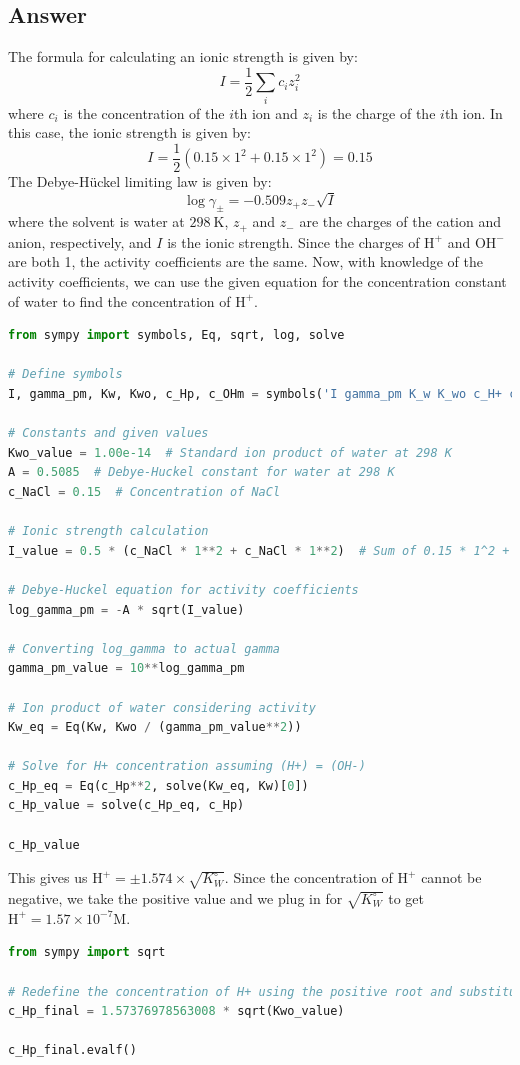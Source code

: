 \documentclass[12pt]{article}
\begin{document}
\subsection{Answer}
The formula for calculating an ionic strength is given by:
\begin{equation}
  I=\frac{1}{2} \sum_{i} c_{i} z_{i}^{2}
\end{equation}
where $c_{i}$ is the concentration of the $i$th ion and $z_{i}$ is the charge of the $i$th ion. In this case, the ionic strength is given by:
\begin{equation}
  I=\frac{1}{2}\left(0.15 \times 1^{2}+0.15 \times 1^{2}\right)=0.15
\end{equation}
The Debye-Hückel limiting law is given by:
\begin{equation}
  \log \gamma_{\pm}=-0.509 z_{+} z_{-} \sqrt{I}
\end{equation}
where the solvent is water at $298 \mathrm{~K}$, $z_{+}$ and $z_{-}$ are the charges of the cation and anion, respectively, and $I$ is the ionic strength. Since the charges of $\mathrm{H}^{+}$ and $\mathrm{OH}^{-}$ are both 1, the activity coefficients are the same.
Now, with knowledge of the activity coefficients, we can use the given equation for the concentration constant of water to find the concentration of $\mathrm{H}^{+}$.
\begin{lstlisting}[language=Python]
from sympy import symbols, Eq, sqrt, log, solve

# Define symbols
I, gamma_pm, Kw, Kwo, c_Hp, c_OHm = symbols('I gamma_pm K_w K_wo c_H+ c_OH-')

# Constants and given values
Kwo_value = 1.00e-14  # Standard ion product of water at 298 K
A = 0.5085  # Debye-Huckel constant for water at 298 K
c_NaCl = 0.15  # Concentration of NaCl

# Ionic strength calculation
I_value = 0.5 * (c_NaCl * 1**2 + c_NaCl * 1**2)  # Sum of 0.15 * 1^2 + 0.15 * 1^2

# Debye-Huckel equation for activity coefficients
log_gamma_pm = -A * sqrt(I_value)

# Converting log_gamma to actual gamma
gamma_pm_value = 10**log_gamma_pm

# Ion product of water considering activity
Kw_eq = Eq(Kw, Kwo / (gamma_pm_value**2))

# Solve for H+ concentration assuming (H+) = (OH-)
c_Hp_eq = Eq(c_Hp**2, solve(Kw_eq, Kw)[0])
c_Hp_value = solve(c_Hp_eq, c_Hp)

c_Hp_value
\end{lstlisting}
This gives us $\mathrm{H}^{+}= \pm 1.574 \times \sqrt{K_W^{\circ}}$. Since the concentration of $\mathrm{H}^{+}$ cannot be negative, we take the positive value and we plug in for $\sqrt{K_W^{\circ}}$ to get $\mathrm{H}^{+}=1.57 \times 10^{-7} \mathrm{M}$.
\begin{lstlisting}[language=Python]
from sympy import sqrt

# Redefine the concentration of H+ using the positive root and substituting Kwo_value
c_Hp_final = 1.57376978563008 * sqrt(Kwo_value)

c_Hp_final.evalf()
\end{lstlisting}
\end{document}
